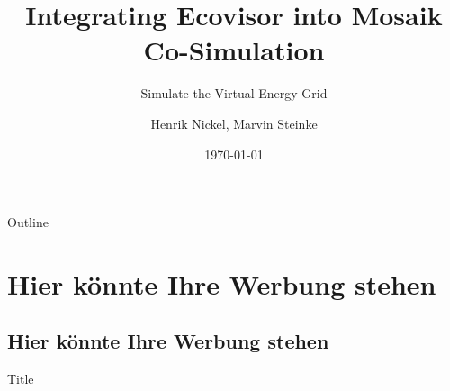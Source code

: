 \documentclass[aspectratio=169, 10pt]{beamer}
\title[Ecovisor \& Mosaik Co-Simulation]{
    Integrating Ecovisor into Mosaik Co-Simulation
}
\subtitle{Simulate the Virtual Energy Grid}
\author[Nickel \& Steinke]{Henrik Nickel, Marvin Steinke}
\institute{Technische Universität Berlin}
\date{\today}
\begin{document}
\frame[plain]{\titlepage}
\begin{frame}{Outline}
    \tableofcontents
\end{frame}

\section{Hier könnte Ihre Werbung stehen}
\subsection{Hier könnte Ihre Werbung stehen}
\frame[noframenumbering]{\sectionpage}
\begin{frame}{Title}
\end{frame}
\end{document}
